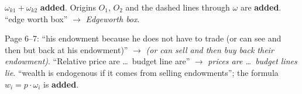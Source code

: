 \documentclass[11pt]{article}
\begin{document}
\begin{transcriptnotes}
        $\omega_{k1}+\omega_{k2}$ \textbf{added}. Origins $O_1$, $O_2$ and the dashed
        lines through $\omega$ are \textbf{added}. ``edge worth box'' $\to$
        \emph{Edgeworth box}.
  \item Page 6--7: ``his endowment because he does not have to trade (or can see and
        then but back at his endowment)'' $\to$ \emph{(or can sell and then buy back
        their endowment)}. ``Relative price are \ldots\ budget line are'' $\to$
        \emph{prices are \ldots\ budget lines lie}. ``wealth is endogenous if it comes
        from selling endowments''; the formula $w_i=p\cdot\omega_i$ is \textbf{added}.
\end{transcriptnotes}
\end{document}
